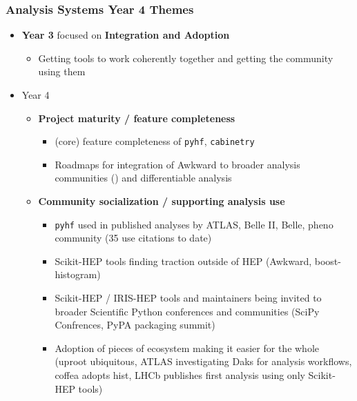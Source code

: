 \begin{frame}
  \frametitle{Analysis Systems Year 4 Themes}

  \begin{itemize}\setlength{\itemsep}{0.25 cm}
    \item \textbf{Year 3} focused on \textbf{Integration and Adoption}
    \begin{itemize}
      \item Getting tools to work coherently together and getting the community using them
    \end{itemize}
    \item Year 4
    \begin{itemize}
      \item \textbf{Project maturity / feature completeness}
      \begin{itemize}
        \item (core) feature completeness of \texttt{pyhf}, \texttt{cabinetry}
        \item Roadmaps for integration of Awkward to broader analysis communities () and differentiable analysis
      \end{itemize}
      \item \textbf{Community socialization / supporting analysis use}
      \begin{itemize}
        \item \texttt{pyhf} used in published analyses by ATLAS, Belle II, Belle, pheno community (35 use citations to date)
        \item Scikit-HEP tools finding traction outside of HEP (Awkward, boost-histogram)
        \item Scikit-HEP / IRIS-HEP tools and maintainers being invited to broader Scientific Python conferences and communities (SciPy Confrences, PyPA packaging summit)
        \item Adoption of pieces of ecosystem making it easier for the whole (uproot ubiquitous, ATLAS investigating Daks for analysis workflows, coffea adopts hist, LHCb publishes first analysis using only Scikit-HEP tools)
      \end{itemize}
    \end{itemize}
  \end{itemize}

\end{frame}

